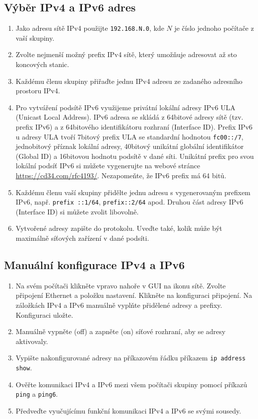 \documentclass[a4paper,11pt]{article}
\begin{document}
\subsection{Výběr IPv4 a IPv6 adres}
\begin{enumerate}
    \item Jako adresu sítě IPv4 použijte \texttt{192.168.N.0}, kde $N$ je číslo jednoho počítače z vaší skupiny. 
    \item Zvolte nejmenší možný prefix IPv4 sítě, který umožňuje adresovat až sto koncových stanic.
    \item Každému členu skupiny přiřaďte jednu IPv4 adresu ze zadaného adresního prostoru IPv4.
    \item Pro vytváření podsítě IPv6 využijeme privátní lokální adresy IPv6 ULA (Unicast Local Address). IPv6 adresa se skládá z 64bitové adresy sítě (tzv. prefix IPv6) a z 64bitového identifikátoru rozhraní (Interface ID). Prefix IPv6 u adresy ULA tvoří 7bitový prefix ULA se standardní hodnotou {\tt fc00::/7}, jednobitový příznak lokální adresy, 40bitový unikátní globální identifikátor (Global ID) a 16bitovou hodnotu podsítě v dané síti. Unikátní prefix pro svou lokální podsíť IPv6 si můžete vygenerujte  na webové stránce \url{https://cd34.com/rfc4193/}. Nezapomeňte, že IPv6 prefix má 64 bitů. 
    \item Každému členu vaší skupiny přidělte jednu adresu s vygenerovaným prefixem IPv6, např. {\tt prefix ::1/64}, {\tt prefix::2/64} apod. Druhou část adresy IPv6 (Interface ID) si můžete zvolit libovolně.
    \item Vytvořené adresy zapište do protokolu. Uveďte také, kolik může být maximálně síťových zařízení v dané podsíti.
\end{enumerate}

\subsection{Manuální konfigurace IPv4 a IPv6}

\begin{enumerate}
    \item Na svém počítači klikněte vpravo nahoře v GUI na ikonu sítě. Zvolte připojení Ethernet a položku nastavení.
      Klikněte na konfiguraci připojení. Na záložkách IPv4 a IPv6  manuálně vyplňte přidělené adresy a prefixy. Konfiguraci uložte.
    \item Manuálně vypněte (off) a zapněte (on) síťové rozhraní, aby se adresy aktivovaly.
    \item Vypište nakonfigurované adresy na příkazovém řádku příkazem {\tt ip address show}.
    \item Ověřte komunikaci IPv4 a IPv6 mezi všem počítači skupiny pomocí příkazů {\tt ping} a {\tt ping6}.
    \item Předveďte vyučujícímu funkční komunikaci IPv4 a IPv6 se svými sousedy. 
\end{enumerate}
\end{document}
